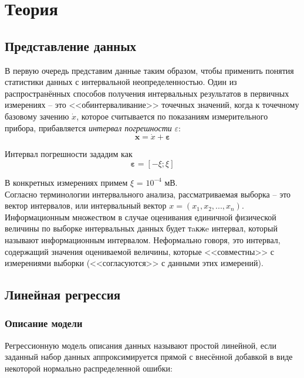 \section{Теория}

\subsection{Представление данных}
В первую очередь представим данные таким образом, чтобы применить понятия статистики данных с интервальной неопределенностью.
Один из распространённых способов получения интервальных результатов в первичных измерениях -- это <<обинтерваливание>> точечных значений, когда к точечному базовому зачению $\dot x$, которое считывается по показаниям измерительного прибора, прибавляется
\textit{интервал погрешности} $\varepsilon$:
\begin{equation}
	\textbf{x}=\dot {x}+ \mathbf{\varepsilon}
\end{equation}

Интервал погрешности зададим как
\begin{equation*}
	\mathbf{\varepsilon}=[-\xi;\xi]
\end{equation*}

В конкретных измерениях примем $\xi$ = $10^{-4}$ мВ. \\
Согласно терминологии интервального анализа, рассматриваемая выборка -- это вектор интервалов, или интервальный вектор $x=(x_1, x_2, ..., x_n)$. \\
Информационным множеством в случае оценивания единичной физической величины по выборке интервальных данных будет тaкжe интервал, который называют информационным интервалом. Неформально говоря, это интервал, содержащий значения оцениваемой величины, которые <<совместны>> с измерениями выборки (<<согласуются>> с данными этих измерений).



\subsection{Линейная регрессия}

\subsubsection{Описание модели}
Регрессионную модель описания данных называют простой линейной, если заданный набор данных аппроксимируется прямой с внесённой добавкой в виде некоторой нормально распределенной ошибки:

